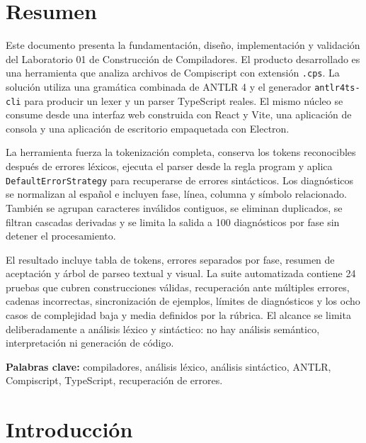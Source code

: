 \documentclass[12pt,letterpaper,oneside]{report}
\newcommand{\archivo}[1]{\texttt{#1}}
\newcommand{\regla}[1]{\textsf{#1}}
\newcommand{\ANTLR}{ANTLR 4}
\newcommand{\cps}{\texttt{.cps}}
\begin{document}
\hypersetup{pageanchor=true}

\chapter*{Resumen}

Este documento presenta la fundamentación, diseño, implementación y validación del
Laboratorio 01 de Construcción de Compiladores. El producto desarrollado es una
herramienta que analiza archivos de Compiscript con extensión \cps. La solución
utiliza una gramática combinada de \ANTLR{} y el generador \archivo{antlr4ts-cli}
para producir un lexer y un parser TypeScript reales. El mismo núcleo se consume
desde una interfaz web construida con React y Vite, una aplicación de consola y una
aplicación de escritorio empaquetada con Electron.

La herramienta fuerza la tokenización completa, conserva los tokens reconocibles
después de errores léxicos, ejecuta el parser desde la regla \regla{program} y aplica
\archivo{DefaultErrorStrategy} para recuperarse de errores sintácticos. Los
diagnósticos se normalizan al español e incluyen fase, línea, columna y símbolo
relacionado. También se agrupan caracteres inválidos contiguos, se eliminan
duplicados, se filtran cascadas derivadas y se limita la salida a 100 diagnósticos
por fase sin detener el procesamiento.

El resultado incluye tabla de tokens, errores separados por fase, resumen de
aceptación y árbol de parseo textual y visual. La suite automatizada contiene 24
pruebas que cubren construcciones válidas, recuperación ante múltiples errores,
cadenas incorrectas, sincronización de ejemplos, límites de diagnósticos y los ocho
casos de complejidad baja y media definidos por la rúbrica. El alcance se limita
deliberadamente a análisis léxico y sintáctico: no hay análisis semántico,
interpretación ni generación de código.

\textbf{Palabras clave:} compiladores, análisis léxico, análisis sintáctico, ANTLR,
Compiscript, TypeScript, recuperación de errores.

\tableofcontents
\listoffigures
\listoftables
\clearpage
{}

\chapter{Introducción}
\end{document}
